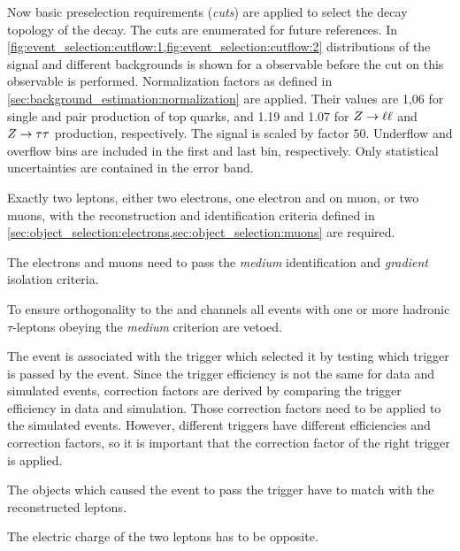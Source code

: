 Now basic preselection requirements (\emph{cuts}) are applied to select the decay topology of the \Httll{} decay.
The cuts are enumerated for future references.
In \cref{fig:event_selection:cutflow:1,fig:event_selection:cutflow:2}
distributions of the signal and different backgrounds is shown for a observable before the cut on this observable is performed.
Normalization factors as defined in \cref{sec:background_estimation:normalization} are applied.
Their values are 1,06 for single and pair production of top quarks, and 1.19 and 1.07 for $Z \to \ell \ell$ and $Z \to \tau \tau$ production, respectively.
The signal is scaled by factor $50$.
Underflow and overflow bins are included in the first and last bin, respectively.
Only statistical uncertainties are contained in the error band.
\begin{description}[style=nextline,leftmargin=1cm]
    \item[\ \,(1) Number of leptons]
        Exactly two leptons, either two electrons, one electron and on muon, or two muons, with the reconstruction
        and identification criteria defined in \cref{sec:object_selection:electrons,sec:object_selection:muons} are required.
    \item[\ \,(2) Lepton identification and isolation criteria]
        The electrons and muons need to pass the \emph{medium} identification and \emph{gradient} isolation criteria.
    \item[\ \,(3) Hadronic tau veto]
        To ensure orthogonality to the \Httlh{} and \Htthh{} channels all events with one or more hadronic $\tau$-leptons
        obeying the \emph{medium} criterion are vetoed.
    \item[\ \,(4) Trigger]
        The event is associated with the trigger which selected it by testing which trigger is passed by the event.
        Since the trigger efficiency is not the same for data and simulated events, correction factors
        are derived by comparing the trigger efficiency in data and simulation.
        Those correction factors need to be applied to the simulated events.
        However, different triggers have different efficiencies and correction factors, so it is important that the
        correction factor of the right trigger is applied.
    \item[\ \,(5) Trigger matching]
        The objects which caused the event to pass the trigger have to match with the reconstructed leptons.
    \item[\ \,(6) Opposite sign]
        The electric charge of the two leptons has to be opposite.

\end{description}
